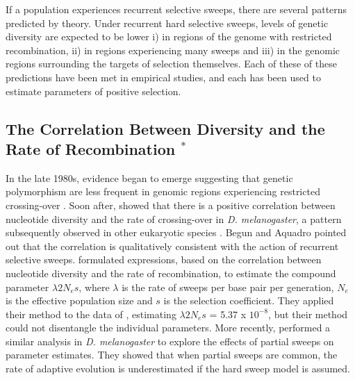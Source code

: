 If a population experiences recurrent selective sweeps, there are several patterns predicted by theory. Under recurrent hard selective sweeps, levels of genetic diversity are expected to be lower i) in regions of the genome with restricted recombination, ii) in regions experiencing many sweeps and iii) in the genomic regions surrounding the targets of selection themselves. Each of these of these predictions have been met in empirical studies, and each has been used to estimate parameters of positive selection.


\subsection[The Correlation Between Diversity and the Rate of Recombination]{The Correlation Between Diversity and the Rate of Recombination $^*$}

In the late 1980s, evidence began to emerge suggesting that genetic polymorphism are less frequent in genomic regions experiencing restricted crossing-over \citep{RN225,RN282}. Soon after, \cite{RN114} showed that there is a positive correlation between nucleotide diversity and the rate of crossing-over in \emph{D. melanogaster}, a pattern subsequently observed in other eukaryotic species \citep{RN117}. Begun and Aquadro pointed out that the correlation is qualitatively consistent with the action of recurrent selective sweeps. \cite{RN277} formulated expressions, based on the correlation between nucleotide diversity and the rate of recombination, to estimate the compound parameter $\lambda 2N_{e}s$, where $\lambda$ is the rate of sweeps per base pair per generation, $N_e$ is the effective population size and $s$ is the selection coefficient. They applied their method to the data of \cite{RN114}, estimating $\lambda2N_{e}s$ = 5.37 x $10^{-8}$, but their method could not disentangle the individual parameters. More recently, \cite{RN226} performed a similar analysis in \emph{D. melanogaster} to explore the effects of partial sweeps on parameter estimates. They showed that when partial sweeps are common, the rate of adaptive evolution is underestimated if the hard sweep model is assumed.
 
